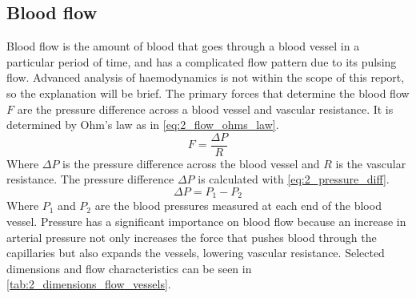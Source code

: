 \subsection{Blood flow}
Blood flow is the amount of blood that goes through a blood vessel in a particular period of time, and has a complicated flow pattern due to its pulsing flow. Advanced analysis of haemodynamics is not within the scope of this report, so the explanation will be brief. The primary forces that determine the blood flow $F$ are the pressure difference across a blood vessel and vascular resistance. It is determined by Ohm's law as in \cref{eq:2_flow_ohms_law}.
\begin{equation} \label{eq:2_flow_ohms_law}
	F = \frac{\Delta P}{R}
\end{equation}
Where $\Delta P$ is the pressure difference across the blood vessel and $R$ is the vascular resistance. The pressure difference $\Delta P$ is calculated with \cref{eq:2_pressure_diff}.
\begin{equation} \label{eq:2_pressure_diff}
	\Delta P = P_{1}-P_{2}
\end{equation}
Where $P_{1}$ and $P_{2}$ are the blood pressures measured at each end of the blood vessel. Pressure has a significant importance on blood flow because an increase in arterial pressure not only increases the force that pushes blood through the capillaries but also expands the vessels, lowering vascular resistance. Selected dimensions and flow characteristics can be seen in \cref{tab:2_dimensions_flow_vessels}.

